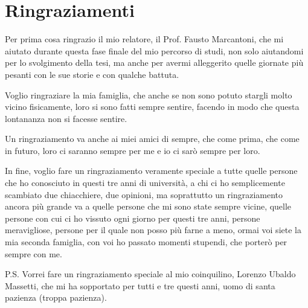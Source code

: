 \chapter*{Ringraziamenti}

Per prima cosa ringrazio il mio relatore, il Prof. Fausto Marcantoni, che mi aiutato durante questa fase finale del mio percorso di studi, non solo aiutandomi per lo svolgimento della tesi, ma anche per avermi alleggerito quelle giornate più pesanti con le sue storie e con qualche battuta.

Voglio ringraziare la mia famiglia, che anche se non sono potuto stargli molto vicino fisicamente, loro si sono fatti sempre sentire, facendo in modo che questa lontananza non si facesse sentire.

Un ringraziamento va anche ai miei amici di sempre, che come prima, che come in futuro, loro ci saranno sempre per me e io ci sarò sempre per loro.

In fine, voglio fare un ringraziamento veramente speciale a tutte quelle persone che ho conosciuto in questi tre anni di università, a chi ci ho semplicemente scambiato due chiacchiere, due opinioni, ma soprattutto un ringraziamento ancora più grande va a quelle persone che mi sono state sempre vicine, quelle persone con cui ci ho vissuto ogni giorno per questi tre anni, persone meravigliose, persone per il quale non posso più farne a meno, ormai voi siete la mia seconda famiglia, con voi ho passato momenti stupendi, che porterò per sempre con me.

P.S. Vorrei fare un ringraziamento speciale al mio coinquilino, Lorenzo Ubaldo Massetti, che mi ha sopportato per tutti e tre questi anni, uomo di santa pazienza (troppa pazienza).